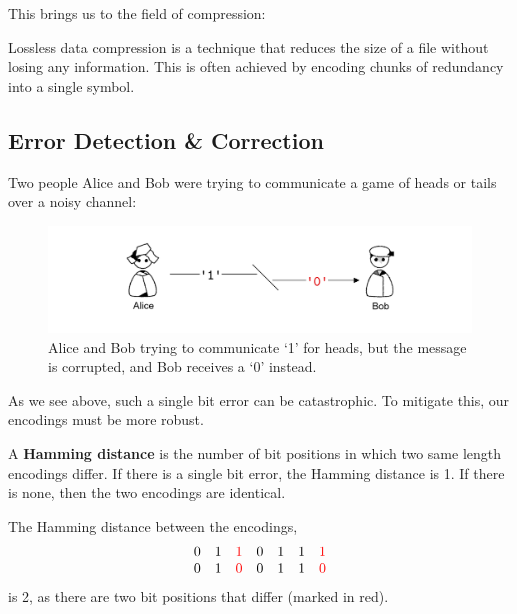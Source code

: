 \newpage 

\noindent
This brings us to the field of compression:
\begin{Def}

    \noindent
    Lossless data compression is a technique that reduces the size of a file without losing any information.
    This is often achieved by encoding chunks of redundancy into a single symbol.
\end{Def}


\subsection{Error Detection \& Correction}

\label{sec:info_error}
Two people Alice and Bob were trying to communicate a game of heads or tails over a noisy channel:

\begin{figure}[ht!]
    \centering
    \includegraphics[width=\textwidth]{./Sections/comp/info_effic/noisy.png}
    \caption{Alice and Bob trying to communicate `1' for heads, but the message is corrupted, and Bob 
    receives a `0' instead. }
    \label{fig:error_detection}
\end{figure}

\noindent
As we see above, such a single bit error can be catastrophic. To mitigate this, our encodings must be more robust.
\begin{Def}

    A \textbf{Hamming distance} is the number of bit positions in which two same length encodings differ. If 
    there is a single bit error, the Hamming distance is 1. If there is none, then the two encodings are identical.
\end{Def}

\begin{Example}

    \noindent
    The Hamming distance between the encodings,
    \[
    \begin{array}{ccccccc}
    0 & 1 & \textcolor{red}{1} & 0 & 1 & 1 & \textcolor{red}{1} \\
    0 & 1 & \textcolor{red}{0} & 0 & 1 & 1 & \textcolor{red}{0} \\
    \end{array}
    \]
    \noindent
    is 2, as there are two bit positions that differ (marked in red).
\end{Example}

